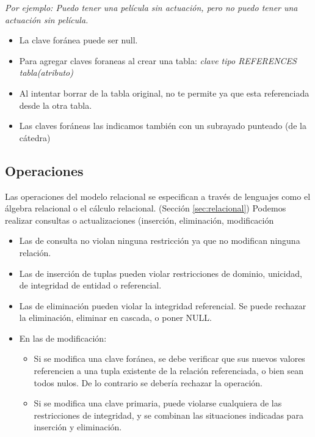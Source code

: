 \medskip

\textit{Por ejemplo: Puedo tener una película sin actuación, pero no puedo tener una actuación sin película.}

\begin{itemize}
\item La clave foránea puede ser null.
\item Para agregar claves foraneas al crear una tabla: \textit{clave tipo REFERENCES tabla(atributo)}
\item Al intentar borrar de la tabla original, no te permite ya que esta referenciada desde la otra tabla.
\item Las claves foráneas las indicamos también con un subrayado punteado (de la cátedra)
\end{itemize}


\subsection*{Operaciones}

Las operaciones del modelo relacional se especifican a través de lenguajes como el álgebra relacional o el cálculo relacional. (Sección \ref{sec:relacional})
Podemos realizar consultas o actualizaciones (inserción, eliminación, modificación

\smallskip

\begin{itemize}
\item Las de consulta no violan ninguna restricción ya que no modifican ninguna relación.
\item Las de inserción de tuplas pueden violar restricciones de dominio, unicidad, de integridad de entidad o referencial.
\item Las de eliminación pueden violar la integridad referencial. Se puede rechazar la eliminación, eliminar en cascada, o poner NULL.
\item En las de modificación:
    \begin{itemize}
        \item Si se modifica una clave foránea, se debe verificar que sus nuevos valores referencien a una tupla existente de la relación referenciada, o bien sean todos nulos. De lo contrario se debería rechazar la operación.
        \item Si se modifica una clave primaria, puede violarse cualquiera de las restricciones de integridad, y se combinan las situaciones indicadas para inserción y eliminación.
    \end{itemize}
\end{itemize}

